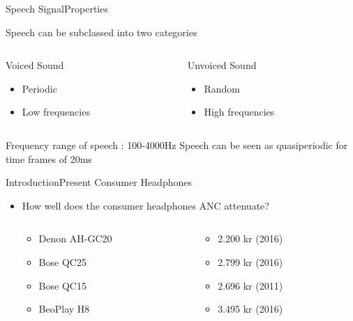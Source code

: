 \begin{frame}{Speech Signal}{Properties}
	\begin{center}

 	Speech can be subclassed into two categories	
 	\vspace{0.5cm}
	\begin{columns}
		\begin{column}{0.5\textwidth}
		Voiced Sound
		\begin{itemize}
			\item Periodic 
			\item Low frequencies
		\end{itemize}
		\end{column}
		\begin{column}{0.5\textwidth} 
		Unvoiced Sound 
		\begin{itemize}
			\item Random
			\item High frequencies
		\end{itemize}		
		\end{column}
	\end{columns}
	\vspace{1cm}
	Frequency range of speech : 100-4000Hz
	\vspace{1cm}
	Speech can be seen as quasiperiodic for time frames of 20ms 
\end{center}
\end{frame}

\begin{frame}{Introduction}{Present Consumer Headphones}
	\begin{itemize}	
	\item How well does the consumer headphones ANC attenuate?
	\begin{columns}
		\begin{column}{0.27\textwidth}
		\begin{itemize}
			\item Denon AH-GC20
			\item Bose QC25 
			\item Bose QC15 	
			\item BeoPlay H8 	
		\end{itemize}
		\end{column}
		\begin{column}{0.6\textwidth} 
		\begin{itemize}
			\item[] 2.200 kr (2016)
			\item[] 2.799 kr (2016)
			\item[] 2.696 kr (2011)
			\item[] 3.495 kr (2016)
		\end{itemize}
		\end{column}
	\end{columns}
	\end{itemize}			
	\begin{center}
		
	\end{center}	
\end{frame}

